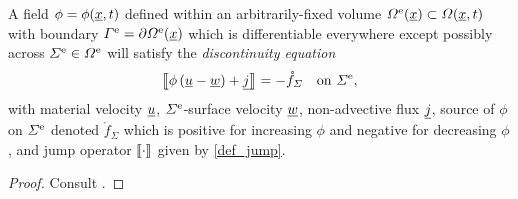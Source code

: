 \begin{theorem}
\label{thm_discontinuity_equation}
A field $\phi = \phi(\underline{x},t)$ defined within an arbitrarily-fixed volume $\varOmega^{\mathrm{e}}(\underline{x}) \subset \varOmega(\underline{x}, t)$ with boundary $\varGamma^{\mathrm{e}} = \partial \varOmega^{\mathrm{e}}(\underline{x})$ which is differentiable everywhere except possibly across $\varSigma^{\mathrm{e}} \in \varOmega^{\mathrm{e}}$ will satisfy the \emph{discontinuity equation}
\begin{align*}
  \left\llbracket {\phi \left( \underline{u} - \underline{w} \right) + \underline{j}} \right\rrbracket = - \mathring{f}_{\varSigma} && \text{on } \varSigma^{\mathrm{e}},
\end{align*}
with material velocity $\underline{u}$, $\varSigma^{\mathrm{e}}$-surface velocity $\underline{w}$, non-advective flux $\underline{j}$, source of $\phi$ on $\varSigma^{\mathrm{e}}$ denoted $\mathring{f}_{\Sigma}$ which is positive for increasing $\phi$ and negative for decreasing $\phi$, and jump operator $\left\llbracket {\cdot} \right\rrbracket$ given by \ref{def_jump}.
\end{theorem}

\begin{proof}
Consult \citet{cummings_2018}.
\end{proof}

